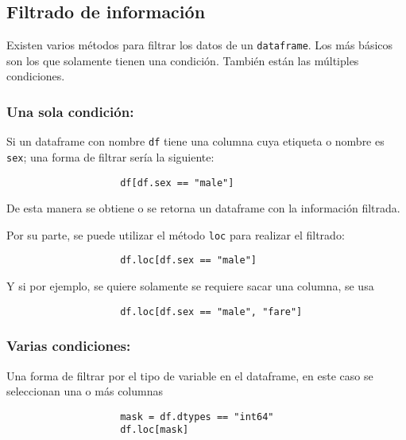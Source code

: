         \subsection{Filtrado de información}

            Existen varios métodos para filtrar los datos de un \texttt{dataframe}. Los más básicos son los que solamente tienen una condición. También están las múltiples condiciones.

            \subsubsection{Una sola condición:} Si un dataframe con nombre \texttt{df} tiene una columna cuya etiqueta o nombre es \texttt{sex}; una forma de filtrar sería la siguiente:

                \begin{verbatim}
                    df[df.sex == "male"]
                \end{verbatim}

                De esta manera se obtiene o se retorna un dataframe con la información filtrada.

                Por su parte, se puede utilizar el método \texttt{loc} para realizar el filtrado:

                \begin{verbatim}
                    df.loc[df.sex == "male"]    
                \end{verbatim}

                Y si por ejemplo, se quiere solamente se requiere sacar una columna, se usa
                \begin{verbatim}
                    df.loc[df.sex == "male", "fare"]    
                \end{verbatim}

            \subsubsection{Varias condiciones:}


                Una forma de filtrar por el tipo de variable en el dataframe, en este caso se seleccionan una o más columnas

                \begin{verbatim}
                    mask = df.dtypes == "int64"
                    df.loc[mask]    
                \end{verbatim}

